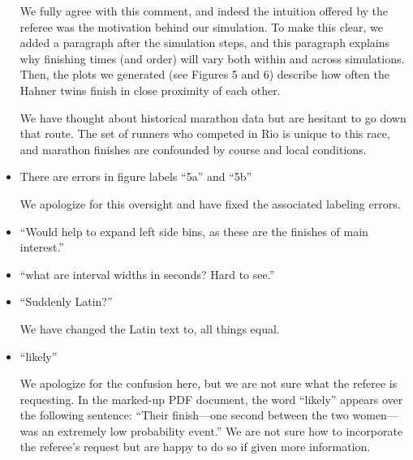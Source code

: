 \documentclass[12pt]{article}
\begin{document}
\begin{itemize}
  We fully agree with this comment, and indeed the intuition offered
  by the referee was the motivation behind our simulation.  To make
  this clear, we added a paragraph after the simulation steps, and
  this paragraph explains why finishing times (and order) will vary
  both within and across simulations.  Then, the plots we generated
  (see Figures 5 and 6) describe how often the Hahner twins finish
  in close proximity of each other.

  We have thought about historical marathon data but are hesitant to
  go down that route.  The set of runners who competed in Rio is
  unique to this race, and marathon finishes are confounded by course
  and local conditions.
  
\item There are errors in figure labels ``5a'' and ``5b''
  
  We apologize for this oversight and have fixed the associated
  labeling errors.

\item ``Would help to expand left side bins, as these are the finishes
  of main interest.''

\item ``what are interval widths in seconds? Hard to see.''

\item ``Suddenly Latin?''
  
  We have changed the Latin text to, all things equal.
  
\item ``likely''

  We apologize for the confusion here, but we are not sure what the
  referee is requesting.  In the marked-up PDF document, the word
  ``likely'' appears over the following sentence: ``Their finish—one
  second between the two women—was an extremely low probability
  event.''  We are not sure how to incorporate the referee's request
  but are happy to do so if given more information.

\end{itemize}

 
\end{document}

